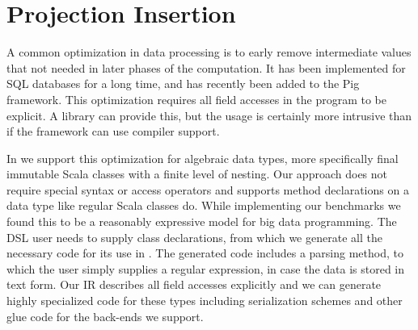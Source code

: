 \section{Projection Insertion}
\label{sec:field-reduction}

A common optimization in data processing is to early remove intermediate values that not needed in later phases of the computation. It has been implemented for SQL databases for a long time, and has recently been added to the Pig framework. This optimization requires all field accesses in the program to be explicit. A library can provide this, but the usage is certainly more intrusive than if the framework can use compiler support. 


In \tool we support this optimization for algebraic data types, more specifically final immutable Scala classes with a finite level of nesting. Our approach does not require special syntax or access operators and supports method declarations on a data type like regular Scala classes do. While implementing our benchmarks we found this to be a reasonably expressive model for big data programming. The DSL user needs to supply class declarations, from which we generate all the necessary code for its use in \tool. The generated code includes a parsing method, to which the user simply supplies a regular expression, in case the data is stored in text form. Our IR describes all field accesses explicitly and we can generate highly specialized code for these types including serialization schemes and other glue code for the back-ends we support.

